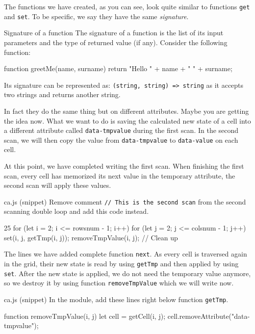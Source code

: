 The functions we have created, as you can see, look quite similar to functions
\texttt{get} and \texttt{set}. To be specific, we say they have the same
\textit{signature}.

\begin{tips}{Signature of a function}
The signature of a function is the list of its input parameters and the type of returned
value (if any). Consider the following function:
\begin{code}
function greetMe(name, surname) {
  return "Hello " + name + " " + surname;
}
\end{code}
Its signature can be represented as: \texttt{(string, string) => string} as it accepts
two strings and returns another string.
\end{tips}

In fact they do the same thing but on different attributes. Maybe you are getting the
idea now. What we want to do is saving the calculated new state of a cell into a
different attribute called \texttt{data-tmpvalue} during the first scan. In the second scan,
we will then copy the value from \texttt{data-tmpvalue} to \texttt{data-value} on
each cell.

At this point, we have completed writing the first scan. When finishing the first scan,
every cell has memorized its next value in the temporary attribute,
the second scan will apply these values.

\begin{programcode}{ca.js (snippet)}
Remove comment \texttt{// This is the second scan} from the second scanning double loop and add this
code instead.
\begin{codeh1}{2}{5}
for (let i = 2; i <= rowsnum - 1; i++) {
  for (let j = 2; j <= colsnum - 1; j++) {
    set(i, j, getTmp(i, j));
    removeTmpValue(i, j); // Clean up
  }
}
\end{codeh1}
\end{programcode}

The lines we have added complete function \texttt{next}. As every cell is traversed again in the grid,
their new state is read by using \texttt{getTmp} and then applied by using \texttt{set}. After the new
state is applied, we do not need the temporary value anymore, so we destroy it by using function
\texttt{removeTmpValue} which we will write now.

\begin{programcode}{ca.js (snippet)}
In the module, add these lines right below function \texttt{getTmp}.
\begin{code}
function removeTmpValue(i, j) {
  let cell = getCell(i, j);
  cell.removeAttribute("data-tmpvalue");
}
\end{code}
\end{programcode}

